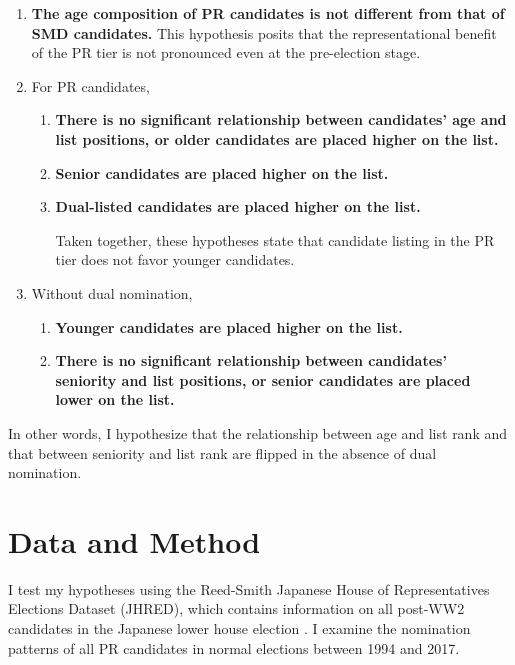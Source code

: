 \documentclass[a4paper, 12pt]{article}
\begin{document}
\begin{enumerate}

	\item \textbf{The age composition of PR candidates is not different from that of SMD candidates.} This hypothesis posits that the representational benefit of the PR tier is not pronounced even at the pre-election stage. 
	
	\item For PR candidates, 
	
	\begin{enumerate}
		\item \textbf{There is no significant relationship between candidates' age and list positions, or older candidates are placed higher on the list. }
		
		\item \textbf{Senior candidates are placed higher on the list.}
		
		\item \textbf{Dual-listed candidates are placed higher on the list.}
		
	Taken together, these hypotheses state that candidate listing in the PR tier does not favor younger candidates. 
		
	\end{enumerate}

	\item Without dual nomination, 
	
	\begin{enumerate}
	
		\item \textbf{Younger candidates are placed higher on the list. }
		
		\item \textbf{There is no significant relationship between candidates' seniority and list positions, or senior candidates are placed lower on the list. }
	\end{enumerate}

\end{enumerate}

\noindent In other words, I hypothesize that the relationship between age and list rank and that between seniority and list rank are flipped in the absence of dual nomination. 

\section{Data and Method}

I test my hypotheses using the Reed-Smith Japanese House of Representatives Elections Dataset (JHRED), which contains information on all post-WW2 candidates in the Japanese lower house election \citep{reedsmith2018}. I examine the nomination patterns of all PR candidates in normal elections between 1994 and 2017. 
\end{document}
